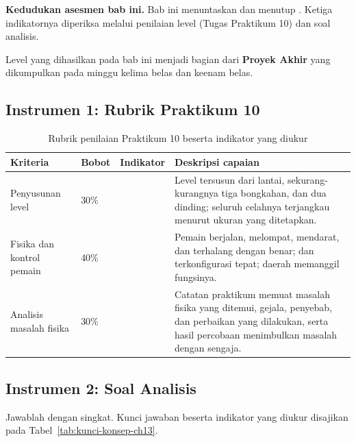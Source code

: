 \label{sec:asesmen-level}

\begin{asesmenbox}
\textbf{Kedudukan asesmen bab ini.} Bab ini menuntaskan  dan
menutup . Ketiga indikatornya diperiksa melalui penilaian level
(Tugas Praktikum 10) dan soal analisis.

\vspace{0.4em}
Level yang dihasilkan pada bab ini menjadi bagian dari \textbf{Proyek Akhir}
yang dikumpulkan pada minggu kelima belas dan keenam belas.
\end{asesmenbox}

\subsection*{Instrumen 1: Rubrik Praktikum 10}

\begin{table}[htbp]
\centering
\caption{Rubrik penilaian Praktikum 10 beserta indikator yang diukur}
\label{tab:rubrik-praktikum-10}
{\setlength{\tabcolsep}{4pt}\footnotesize%
\begin{tabularx}{\textwidth}{@{}L{3.2cm} C{1.3cm} C{2.1cm} Y@{}}
\toprule
\headrow \textbf{Kriteria} & \textbf{Bobot} & \textbf{Indikator} & \textbf{Deskripsi capaian} \\
\midrule
Penyusunan level & 30\% &  &
Level tersusun dari lantai, sekurang-kurangnya tiga bongkahan, dan dua dinding;
seluruh celahnya terjangkau menurut ukuran yang ditetapkan. \\
\addlinespace
Fisika dan kontrol pemain & 40\% &  &
Pemain berjalan, melompat, mendarat, dan terhalang dengan benar;
 dan  terkonfigurasi tepat; daerah
 memanggil fungsinya. \\
\addlinespace
Analisis masalah fisika & 30\% &  &
Catatan praktikum memuat masalah fisika yang ditemui, gejala, penyebab, dan
perbaikan yang dilakukan, serta hasil percobaan menimbulkan masalah dengan
sengaja. \\
\bottomrule
\end{tabularx}}
\end{table}

\subsection*{Instrumen 2: Soal Analisis}

Jawablah dengan singkat. Kunci jawaban beserta indikator yang diukur disajikan
pada Tabel~\ref{tab:kunci-konsep-ch13}.


